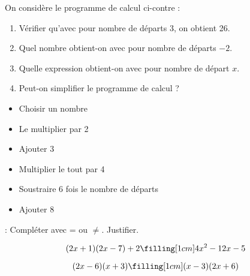 \begin{minipage}[t]{0.5\textwidth}
    On considère le programme de calcul ci-contre :

    \begin{enumerate}
        \item Vérifier qu'avec pour nombre de départs 3, on obtient 26.\vspace{2.5cm}
        \item Quel nombre obtient-on avec pour nombre de départs $-2$.\vspace{2.5cm}
        \item Quelle expression obtient-on avec pour nombre de départ $x$.\vspace{2.5cm}
        \item Peut-on simplifier le programme de calcul ?\vspace{2.5cm}
    \end{enumerate}
\end{minipage}
\hfil
\begin{minipage}[t]{0.45\textwidth}
    \begin{itemize}
        \item Choisir un nombre
        \item Le multiplier par 2
        \item Ajouter 3
        \item Multiplier le tout par 4
        \item Soustraire 6 fois le nombre de départs
        \item Ajouter 8
    \end{itemize}
\end{minipage}




 : Compléter avec = ou $\neq$. Justifier.



\begin{multicols}{2}
    \noindent$$(2x+1)(2x-7)+2\filling[1cm]4x^2-12x-5$$
    \vspace*{10em}\columnbreak

    \noindent$$(2x-6)(x+3)\filling[1cm](x-3)(2x+6)$$
    \vspace*{10em}\columnbreak
\end{multicols}